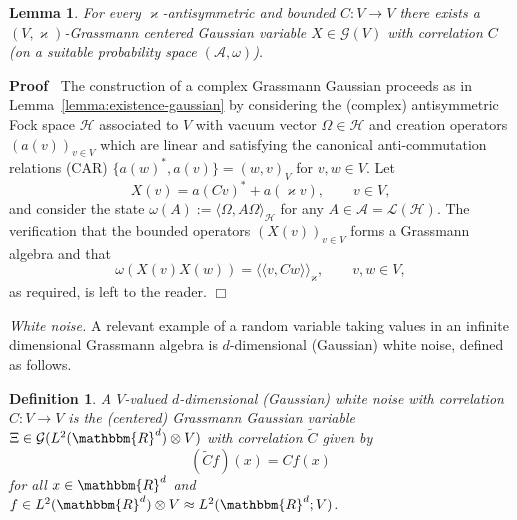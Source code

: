 \documentclass[11pt]{article}
\newcommand{\assign}{:=}
\newcommand{\llangle}{{\langle\!\langle}}
\newcommand{\rrangle}{{\rangle\!\rangle}}
\newcommand{\tmtextit}[1]{{\itshape{#1}}}
\newenvironment{proof}{\noindent\textbf{Proof\ }}{\hspace*{\fill}$\Box$\medskip}
\newtheorem{definition}{Definition}
\newtheorem{lemma}{Lemma}
\begin{document}
\begin{lemma}
  \label{lemma:existence-complex-gaussian}For every $\varkappa$-antisymmetric
  and bounded $C : V \rightarrow V$ there exists a \ $(V,
  \varkappa)$-Grassmann centered Gaussian variable $X \in \mathcal{G} (V)$
  with correlation $C$ (on a suitable probability space $(\mathcal{A},
  \omega)$).
\end{lemma}

\begin{proof}
  The construction of a complex Grassmann Gaussian proceeds as in
  Lemma~\ref{lemma:existence-gaussian} by considering the (complex)
  antisymmetric Fock space $\mathcal{H}$ associated to $V$ with vacuum vector
  $\Omega \in \mathcal{H}$ and creation operators $(a (v))_{v \in V}$ which
  are linear and satisfying the canonical anti-commutation relations (CAR) $\{
  a (w)^{\ast}, a (v) \} = (w, v)_V$ for $v, w \in V$. Let
  \[ X (v) = a (C v)^{\ast} + a (\varkappa v), \qquad v \in V, \]
  and consider the state $\omega (A) \assign \langle \Omega, A \Omega
  \rangle_{\mathcal{H}}$ for any $A \in \mathcal{A}=\mathcal{L}
  (\mathcal{H})$. The verification that the bounded operators $(X (v))_{v \in
  V}$ forms a Grassmann algebra and that
  \[ \omega (X (v) X (w)) = \llangle v, C w \rrangle_{\varkappa}, \qquad v, w
     \in V, \]
  as required, is left to the reader.
\end{proof}

\tmtextit{White noise.} A relevant example of a random variable taking values
in an infinite dimensional Grassmann algebra is $d$-dimensional (Gaussian)
white noise, defined as follows.

\begin{definition}
  \label{definition_Brownian}A $V$-valued $d$-dimensional (Gaussian) white
  noise with correlation $C : V \rightarrow V$ is the (centered) Grassmann
  Gaussian variable $\Xi \in \mathcal{G} (L^2 (\mathbbm{R}^d) \otimes V)$ with
  correlation $\tilde{C}$ given by
  \[ (\tilde{C} f) (x) = C f (x) \]
  for all $x \in \mathbbm{R}^d$ and $f \in L^2 (\mathbbm{R}^d) \otimes V \approx
  L^2 (\mathbbm{R}^d ; V)$.
\end{definition}
\end{document}
